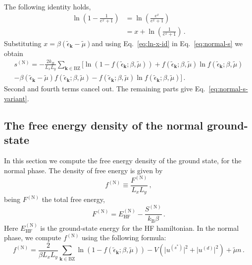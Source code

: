 \begin{tabproof}

	The following identity holds,
	\begin{align}
		\ln \left(
		1-\frac{1}{e^x+1}
		\right) &= \ln \left(
		\frac{e^x}{e^x+1}
		\right) \nonumber \\
		&= x+\ln \left(
		\frac{1}{e^x+1}
		\right) \, . \label{eq:ln-x-id}
	\end{align}
	Substituting $x=\beta (\tilde{\epsilon}_\mathbf{k}-\tilde{\mu})$and using Eq.~\eqref{eq:ln-x-id} in Eq.~\eqref{eq:normal-s} we obtain
	\begin{multline*}
		s^{(\mathrm{N})} = -\frac{2k_B}{L_x L_y} \sum_{\mathbf{k}\in\mathrm{BZ}} \Big[ \ln \left(
		1- f( \tilde{\epsilon}_\mathbf{k}; \beta,\tilde{\mu}) \right) + f( \tilde{\epsilon}_\mathbf{k}; \beta,\tilde{\mu}) \ln f( \tilde{\epsilon}_\mathbf{k}; \beta,\tilde{\mu}) \\
		- \beta (\tilde{\epsilon}_\mathbf{k}-\tilde{\mu}) f( \tilde{\epsilon}_\mathbf{k}; \beta,\tilde{\mu}) - f( \tilde{\epsilon}_\mathbf{k}; \beta,\tilde{\mu}) \ln f( \tilde{\epsilon}_\mathbf{k}; \beta,\tilde{\mu})
		\Big] \, .
	\end{multline*}
	Second and fourth terms cancel out. The remaining parts give Eq.~\eqref{eq:normal-s-variant}.
	
\end{tabproof}

\subsection{The free energy density of the normal ground-state}\label{subsec:normal-f}

In this section we compute the free energy density of the ground state, for the normal phase. The density of free energy is given by
\begin{equation}\label{eq:normal-fMFT-def}
	f^{(\mathrm{N})} \equiv \frac{F^{(\mathrm{N})}}{L_x L_y} \, ,
\end{equation}
being $F^{(\mathrm{N})}$ the total free energy,
\begin{equation}\label{eq:normal-FMFT-def}
	F^{(\mathrm{N})} = E_\mathrm{HF}^{(\mathrm{N})} - \frac{S^{(\mathrm{N})}}{k_\mathrm{B} \beta} \, .
\end{equation}
Here $E_\mathrm{HF}^{(\mathrm{N})}$ is the ground-state energy for the HF hamiltonian. In the normal phase, we compute $f^{(\mathrm{N})}$ using the following formula:
\begin{equation}\label{eq:normal-fMFT}
	f^{(\mathrm{N})} = \frac{2}{\beta L_x L_y} \sum_{\mathbf{k}\in\mathrm{BZ}} \ln \left(1-f( \tilde{\epsilon}_\mathbf{k}; \beta,\tilde{\mu})\right) - V \left( 
		\big|
			u^{(s^*)}
		\big|^2 + \big|
			u^{(d)}
		\big|^2
	\right) + \tilde{\mu} n  \, .
\end{equation}

